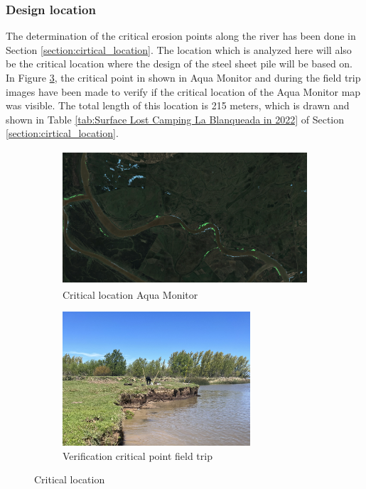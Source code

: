 
\subsubsection{Design location}

The determination of the critical erosion points along the river has been done in Section \ref{section:cirtical_location}. The location which is analyzed here will also be the critical location where the design of the steel sheet pile will be based on. In Figure \ref{fig:critical_location}, the critical point in shown in Aqua Monitor and during the field trip images have been made to verify if the critical location of the Aqua Monitor map was visible. The total length of this location is 215 meters, which is drawn and shown in Table \ref{tab:Surface Lost Camping La Blanqueada in 2022} of Section \ref{section:cirtical_location}.


\begin{figure}[H]
    \centering
    \begin{subfigure}[b]{0.45\textwidth}
        \includegraphics[width=\linewidth, height=5cm]{figures/ch8/critical_location_google.png}
        \caption{Critical location Aqua Monitor}
        \label{fig:critical_location_google}
    \end{subfigure}
    \hfill
    \begin{subfigure}[b]{0.45\textwidth}
        \includegraphics[width=\linewidth, height=5cm]{figures/ch8/critical_location.jpeg}
        \caption{Verification critical point field trip}
        \label{fig:critical_location_fieldtrip}
    \end{subfigure}
    \caption{Critical location}
    \label{fig:critical_location}
\end{figure}

